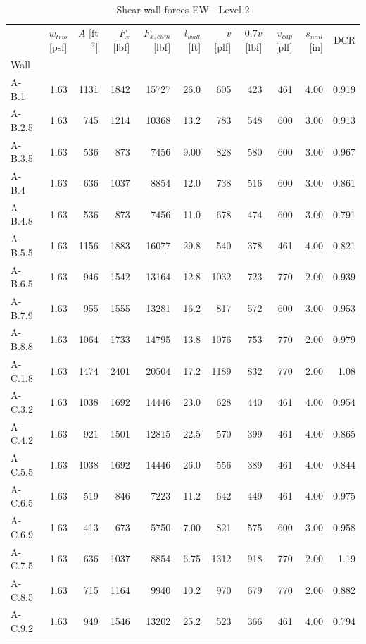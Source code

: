 \documentclass[11pt]{article}
\begin{document}
    
    \begin{table}[H]
\centering
\caption{Shear wall forces EW - Level 2}
\label{tab:shear_wall_forces_level2_ew}
\begin{tabular}{lrrrrrrrrrr}
\toprule
 & $w_{trib}$ [psf] & $A$ [ft$^2$] & $F_x$ [lbf] & $F_{x,cum}$ [lbf] & $l_{wall}$ [ft] & $v$ [plf] & $0.7 v$ [lbf] & $v_{cap}$ [plf] & $s_{nail}$ [in] & DCR \\
Wall &  &  &  &  &  &  &  &  &  &  \\
\midrule
A-B.1 & 1.63 & 1131 & 1842 & 15727 & 26.0 & 605 & 423 & 461 & 4.00 & 0.919 \\
A-B.2.5 & 1.63 & 745 & 1214 & 10368 & 13.2 & 783 & 548 & 600 & 3.00 & 0.913 \\
A-B.3.5 & 1.63 & 536 & 873 & 7456 & 9.00 & 828 & 580 & 600 & 3.00 & 0.967 \\
A-B.4 & 1.63 & 636 & 1037 & 8854 & 12.0 & 738 & 516 & 600 & 3.00 & 0.861 \\
A-B.4.8 & 1.63 & 536 & 873 & 7456 & 11.0 & 678 & 474 & 600 & 3.00 & 0.791 \\
A-B.5.5 & 1.63 & 1156 & 1883 & 16077 & 29.8 & 540 & 378 & 461 & 4.00 & 0.821 \\
A-B.6.5 & 1.63 & 946 & 1542 & 13164 & 12.8 & 1032 & 723 & 770 & 2.00 & 0.939 \\
A-B.7.9 & 1.63 & 955 & 1555 & 13281 & 16.2 & 817 & 572 & 600 & 3.00 & 0.953 \\
A-B.8.8 & 1.63 & 1064 & 1733 & 14795 & 13.8 & 1076 & 753 & 770 & 2.00 & 0.979 \\
A-C.1.8 & {\cellcolor{yellow}} 1.63 & {\cellcolor{yellow}} 1474 & {\cellcolor{yellow}} 2401 & {\cellcolor{yellow}} 20504 & {\cellcolor{yellow}} 17.2 & {\cellcolor{yellow}} 1189 & {\cellcolor{yellow}} 832 & {\cellcolor{yellow}} 770 & {\cellcolor{yellow}} 2.00 & {\cellcolor{yellow}} 1.08 \\
A-C.3.2 & 1.63 & 1038 & 1692 & 14446 & 23.0 & 628 & 440 & 461 & 4.00 & 0.954 \\
A-C.4.2 & 1.63 & 921 & 1501 & 12815 & 22.5 & 570 & 399 & 461 & 4.00 & 0.865 \\
A-C.5.5 & 1.63 & 1038 & 1692 & 14446 & 26.0 & 556 & 389 & 461 & 4.00 & 0.844 \\
A-C.6.5 & 1.63 & 519 & 846 & 7223 & 11.2 & 642 & 449 & 461 & 4.00 & 0.975 \\
A-C.6.9 & 1.63 & 413 & 673 & 5750 & 7.00 & 821 & 575 & 600 & 3.00 & 0.958 \\
A-C.7.5 & {\cellcolor{yellow}} 1.63 & {\cellcolor{yellow}} 636 & {\cellcolor{yellow}} 1037 & {\cellcolor{yellow}} 8854 & {\cellcolor{yellow}} 6.75 & {\cellcolor{yellow}} 1312 & {\cellcolor{yellow}} 918 & {\cellcolor{yellow}} 770 & {\cellcolor{yellow}} 2.00 & {\cellcolor{yellow}} 1.19 \\
A-C.8.5 & 1.63 & 715 & 1164 & 9940 & 10.2 & 970 & 679 & 770 & 2.00 & 0.882 \\
A-C.9.2 & 1.63 & 949 & 1546 & 13202 & 25.2 & 523 & 366 & 461 & 4.00 & 0.794 \\
\bottomrule
\end{tabular}
\end{table}
\end{document}
